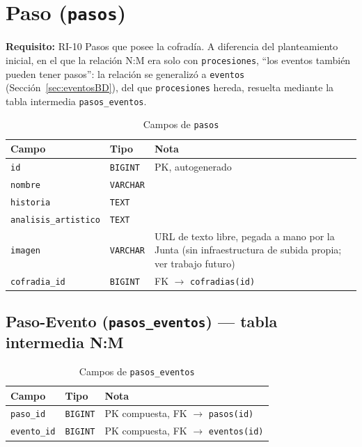 \section{Paso (\texttt{pasos})}
\textbf{Requisito:} RI-10
Pasos que posee la cofradía. A diferencia del planteamiento inicial, en el que la relación N:M era solo con \texttt{procesiones}, ``los eventos también pueden tener pasos'': la relación se generalizó a \texttt{eventos} (Sección~\ref{sec:eventosBD}), del que \texttt{procesiones} hereda, resuelta mediante la tabla intermedia \texttt{pasos\_eventos}.

\begin{table}[H]
\centering
\begin{tabular}{|l|l|p{7cm}|}
\hline
\textbf{Campo} & \textbf{Tipo} & \textbf{Nota} \\
\hline
\texttt{id} & \texttt{BIGINT} & PK, autogenerado \\
\hline
\texttt{nombre} & \texttt{VARCHAR} &  \\
\hline
\texttt{historia} & \texttt{TEXT} &  \\
\hline
\texttt{analisis\_artistico} & \texttt{TEXT} &  \\
\hline
\texttt{imagen} & \texttt{VARCHAR} & URL de texto libre, pegada a mano por la Junta (sin infraestructura de subida propia; ver trabajo futuro) \\
\hline
\texttt{cofradia\_id} & \texttt{BIGINT} & FK $\to$ \texttt{cofradias(id)} \\
\hline
\end{tabular}
\caption{Campos de \texttt{pasos}}
\end{table}

\subsection{Paso-Evento (\texttt{pasos\_eventos}) --- tabla intermedia N:M}
\begin{table}[H]
\centering
\begin{tabular}{|l|l|p{7cm}|}
\hline
\textbf{Campo} & \textbf{Tipo} & \textbf{Nota} \\
\hline
\texttt{paso\_id} & \texttt{BIGINT} & PK compuesta, FK $\to$ \texttt{pasos(id)} \\
\hline
\texttt{evento\_id} & \texttt{BIGINT} & PK compuesta, FK $\to$ \texttt{eventos(id)} \\
\hline
\end{tabular}
\caption{Campos de \texttt{pasos\_eventos}}
\end{table}

